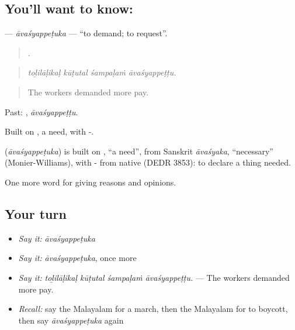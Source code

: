 \subsection*{You'll want to know: }
\textbf{} — \emph{āvaśyappeṭuka} — \textquotedblleft{}to demand; to request\textquotedblright{}.

\begin{quote}
   .
\end{quote}

\begin{quote}
\emph{toḻilāḷikaḷ kūṭutal śampaḷaṁ āvaśyappeṭṭu.}
\end{quote}

\begin{quote}
The workers demanded more pay.
\end{quote}

Past: , \emph{āvaśyappeṭṭu}.

Built on , a need, with -.

\begin{cousinweb}
\textbf{} (\emph{āvaśyappeṭuka}) is built on , \textquotedblleft{}a need\textquotedblright{}, from Sanskrit \emph{āvaśyaka}, \textquotedblleft{}necessary\textquotedblright{} (Monier-Williams), with - from native  (DEDR 3853): to declare a thing needed.
\end{cousinweb}

\begin{grammarlens}[title={What you've built}]
One more word for giving reasons and opinions.
\end{grammarlens}

\subsection*{Your turn}
\begin{itemize}
\raggedright
  \item \emph{Say it:} \emph{āvaśyappeṭuka}
  \item \emph{Say it:} \emph{āvaśyappeṭuka}, once more
  \item \emph{Say it:} \emph{toḻilāḷikaḷ kūṭutal śampaḷaṁ āvaśyappeṭṭu.} — The workers demanded more pay.
  \item \emph{Recall:} say the Malayalam for a march, then the Malayalam for to boycott, then say \emph{āvaśyappeṭuka} again
\end{itemize}

